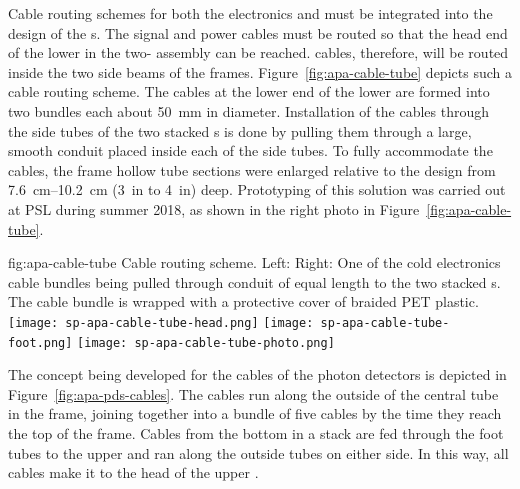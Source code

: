 Cable routing schemes for both the  electronics and  must be integrated into the design of the s.   The  signal and power cables must be routed so that the head end of the lower  in the two- assembly can be reached.  cables, therefore, will be routed inside the two side beams of the  frames. Figure~\ref{fig:apa-cable-tube} depicts such a cable routing scheme.  The  cables at the lower end of the lower  are formed into two bundles each about \SI{50}{mm} in diameter. Installation of the cables through the side tubes of the two stacked s is done by pulling them through a large, smooth conduit placed inside each of the side tubes.  To fully accommodate the cables, the  frame hollow tube sections were enlarged relative to the  design from \SIrange{7.6}{10.2}{cm} (\SI{3}{in} to \SI{4}{in}) deep. Prototyping of this solution was carried out at PSL during summer 2018, as shown in the right photo in Figure~\ref{fig:apa-cable-tube}.     


\begin{dunefigure}{fig:apa-cable-tube}
{Cable routing scheme. Left: Right: One of the cold electronics cable bundles being pulled through conduit of equal length to the two stacked s.  The cable bundle is wrapped with a protective cover of braided PET plastic.  }
\texttt{[image: sp-apa-cable-tube-head.png]} \quad
\texttt{[image: sp-apa-cable-tube-foot.png]} \quad
\texttt{[image: sp-apa-cable-tube-photo.png]}
\end{dunefigure}

The concept being developed for the cables of the photon detectors is depicted in Figure~\ref{fig:apa-pds-cables}.  The cables run along the outside of the central tube in the  frame, joining together into a bundle of five cables by the time they reach the top of the frame.  Cables from the bottom  in a stack are fed through the foot tubes to the upper  and ran along the outside tubes on either side.  In this way, all  cables make it to the head of the upper .  


